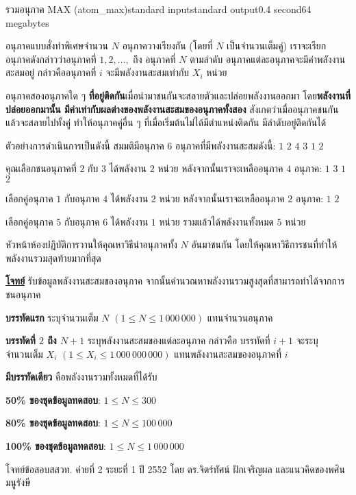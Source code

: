 \documentclass[11pt,a4paper]{article}
\begin{document}
\begin{problem}{รวมอนุภาค MAX (atom\_max)}{standard input}{standard output}{0.4 second}{64 megabytes}

อนุภาคแบบสั่งทำพิเศษจำนวน $N$ อนุภาควางเรียงกัน (โดยที่ $N$ เป็นจำนวนเต็มคู่) เราจะเรียกอนุภาคดังกล่าวว่าอนุภาคที่ $1, 2, ...,$ ถึง อนุภาคที่ $N$ ตามลำดับ อนุภาคแต่ละอนุภาคจะมีค่าพลังงานสะสมอยู่ กล่าวคืออนุภาคที่ $i$ จะมีพลังงานสะสมเท่ากับ $X_i$ หน่วย

            อนุภาคสองอนุภาคใด ๆ \textbf{ที่อยู่ติดกัน}เมื่อนำมาชนกันจะสลายตัวและปล่อยพลังงานออกมา โดย\textbf{พลังงานที่ปล่อยออกมานั้น มีค่าเท่ากับผลต่างของพลังงานสะสมของอนุภาคทั้งสอง} สังเกตว่าเมื่ออนุภาคชนกันแล้วจะสลายไปทั้งคู่ ทำให้อนุภาคคู่อื่น ๆ ที่เมื่อเริ่มต้นไม่ได้มีตำแหน่งติดกัน มีลำดับอยู่ติดกันได้

ตัวอย่างการดำเนินการเป็นดังนี้ สมมติมีอนุภาค $6$ อนุภาคที่มีพลังงานสะสมดังนี้: $1$ $2$ $4$ $3$ $1$ $2$

คุณเลือกชนอนุภาคที่ $2$ กับ $3$ ได้พลังงาน $2$ หน่วย หลังจากนั้นเราจะเหลืออนุภาค $4$ อนุภาค: $1$ $3$ $1$ $2$

เลือกคู่อนุภาค $1$ กับอนุภาค $4$ ได้พลังงาน $2$ หน่วย หลังจากนั้นเราจะเหลืออนุภาค $2$ อนุภาค: $1$ $2$

เลือกคู่อนุภาค $5$ กับอนุภาค $6$ ได้พลังงาน $1$ หน่วย รวมแล้วได้พลังงานทั้งหมด $5$ หน่วย

หัวหน้าห้องปฏิบัติการวานให้คุณหาวิธีนำอนุภาคทั้ง $N$ อันมาชนกัน โดยให้คุณหาวิธีการชนที่ทำให้พลังงานรวมสุดท้ายมากที่สุด

\bigskip
\underline{\textbf{โจทย์}}  รับข้อมูลพลังงานสะสมของอนุภาค จากนั้นคำนวณหาพลังงานรวมสูงสุดที่สามารถทำได้จากการชนอนุภาค

\InputFile

\textbf{บรรทัดแรก} ระบุจำนวนเต็ม $N$ $(1 \leq N \leq 1\,000\,000)$ แทนจำนวนอนุภาค

\textbf{บรรทัดที่ $2$ ถึง $N+1$} ระบุพลังงานสะสมของแต่ละอนุภาค กล่าวคือ บรรทัดที่ $i+1$ จะระบุจำนวนเต็ม $X_i$ $(1 \leq X_i ≤ 1\,000\,000\,000)$ แทนพลังงานสะสมของอนุภาคที่ $i$


\OutputFile

\textbf{มีบรรทัดเดียว} คือพลังงานรวมทั้งหมดที่ได้รับ

\Examples

\begin{example}
%
%
\end{example}

\Scoring

\textbf{50\% ของชุดข้อมูลทดสอบ}: $1 \leq N \leq 300$

\textbf{80\% ของชุดข้อมูลทดสอบ}: $1 \leq N \leq 100\,000$

\textbf{100\% ของชุดข้อมูลทดสอบ}: $1 \leq N \leq 1\,000\,000$

\Source

โจทย์ข้อสอบสสวท. ค่ายที่ 2 ระยะที่ 1 ปี 2552 โดย ดร.จิตร์ทัศน์ ฝักเจริญผล และแนวคิดของพศิน มนูรังษี

\end{problem}
\end{document}
